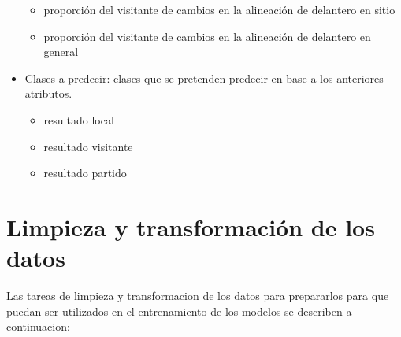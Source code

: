 \begin{itemize}
\begin{itemize}
        \item proporción del visitante de cambios en la alineación de delantero en sitio
        \item proporción del visitante de cambios en la alineación de delantero en general
    \end{itemize}
    \item Clases a predecir: clases que se pretenden predecir en base a los anteriores atributos.
    \begin{itemize}
        \item resultado local
        \item resultado visitante
        \item resultado partido
    \end{itemize}
\end{itemize}




\section{Limpieza y transformación de los datos}
Las tareas de limpieza y transformacion de los datos para prepararlos para que puedan ser utilizados en el entrenamiento de los modelos se describen a continuacion:

